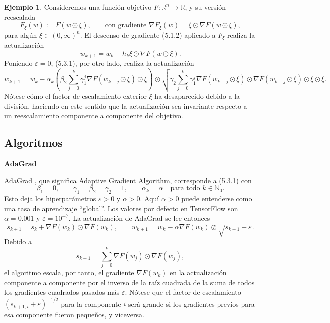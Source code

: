 \documentclass[11pt]{report}
\theoremstyle{definition}
\newtheorem{ejemplo}[definicion]{Ejemplo}
\theoremstyle{plain}
\numberwithin{equation}{section}
\begin{document}
\begin{ejemplo}
Consideremos una función objetivo \(F:\mathbb{R}^n\to\mathbb{R}\), y su versión reescalada
\begin{equation*}
    F_\xi(w):=F(w\odot \xi),
    \qquad
    \text{con gradiente }
    \nabla F_\xi(w)=\xi\odot\nabla F(w\odot \xi),
\end{equation*}
para algún \(\xi\in(0,\infty)^n\). El descenso de gradiente (5.1.2) aplicado a \(F_\xi\) realiza la actualización
\begin{equation*}
    w_{k+1}
    =
    w_k-h_k\xi\odot\nabla F(w\odot \xi).
\end{equation*}
Poniendo \(\varepsilon=0\), (5.3.1), por otro lado, realiza la actualización
\begin{equation*}
    w_{k+1}
    =
    w_k-\alpha_k
    \left(
        \beta_2
        \sum_{j=0}^{k}
        \gamma_1^j\nabla F(w_{k-j}\odot \xi)
        \odot \xi
    \right)
    \oslash
    \sqrt{
        \gamma_2
        \sum_{j=0}^{k}
        \gamma_1^j
        \nabla F(w_{k-j}\odot \xi)
        \odot
        \nabla F(w_{k-j}\odot \xi)
        \odot \xi
        \odot \xi
    }.
\end{equation*}
Nótese cómo el factor de escalamiento exterior \(\xi\) ha desaparecido debido a la división, haciendo en este sentido que la actualización sea invariante respecto a un reescalamiento componente a componente del objetivo.
\end{ejemplo}

\subsection{Algoritmos}

\textbf{AdaGrad}

AdaGrad \cite{duchi-hazan-singer-2011}, que significa Adaptive Gradient Algorithm, corresponde a (5.3.1) con
\begin{equation*}
    \beta_1=0,
    \qquad
    \gamma_1=\beta_2=\gamma_2=1,
    \qquad
    \alpha_k=\alpha
    \quad
    \text{para todo } k\in\mathbb{N}_0.
\end{equation*}
Esto deja los hiperparámetros \(\varepsilon>0\) y \(\alpha>0\). Aquí \(\alpha>0\) puede entenderse como una tasa de aprendizaje ``global''. Los valores por defecto en TensorFlow \cite{kushner-yin-2003} son \(\alpha=0.001\) y \(\varepsilon=10^{-7}\). La actualización de AdaGrad se lee entonces
\begin{equation*}
    s_{k+1}=s_k+\nabla F(w_k)\odot\nabla F(w_k),
    \qquad
    w_{k+1}=w_k-\alpha\nabla F(w_k)\oslash\sqrt{s_{k+1}+\varepsilon}.
\end{equation*}
Debido a
\begin{equation*}
    s_{k+1}
    =
    \sum_{j=0}^{k}
    \nabla F(w_j)\odot\nabla F(w_j),
    \tag{5.3.2}
\end{equation*}
el algoritmo escala, por tanto, el gradiente \(\nabla F(w_k)\) en la actualización componente a componente por el inverso de la raíz cuadrada de la suma de todos los gradientes cuadrados pasados más \(\varepsilon\). Nótese que el factor de escalamiento \((s_{k+1,i}+\varepsilon)^{-1/2}\) para la componente \(i\) será grande si los gradientes previos para esa componente fueron pequeños, y viceversa.
\end{document}
